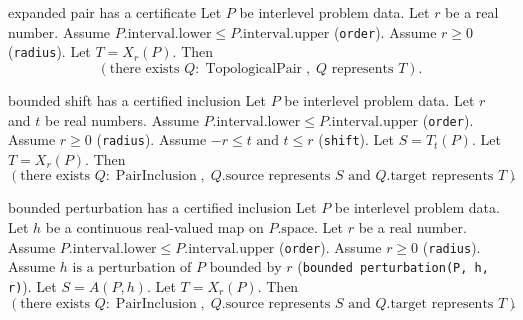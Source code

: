 \begin{cleanresult}{expanded pair has a certificate}
Let $P$ be interlevel problem data.
Let $r$ be a real number.
Assume $P.\mathrm{interval}.\mathrm{lower}\le P.\mathrm{interval}.\mathrm{upper}$ (\texttt{order}).
Assume $r\ge 0$ (\texttt{radius}).
Let $T = X_{r}(P)$.
Then \[\left(\text{there exists }Q : \operatorname{TopologicalPair},\; Q\text{ represents }T\right).\]
\end{cleanresult}

\begin{cleanresult}{bounded shift has a certified inclusion}
Let $P$ be interlevel problem data.
Let $r$ and $t$ be real numbers.
Assume $P.\mathrm{interval}.\mathrm{lower}\le P.\mathrm{interval}.\mathrm{upper}$ (\texttt{order}).
Assume $r\ge 0$ (\texttt{radius}).
Assume $-r\le t\text{ and }t\le r$ (\texttt{shift}).
Let $S = T_{t}(P)$.
Let $T = X_{r}(P)$.
Then \[\left(\text{there exists }Q : \operatorname{PairInclusion},\; Q.\mathrm{source}\text{ represents }S\text{ and }Q.\mathrm{target}\text{ represents }T\right).\]
\par{}
\end{cleanresult}

\begin{cleanresult}{bounded perturbation has a certified inclusion}
Let $P$ be interlevel problem data.
Let $h$ be a continuous real-valued map on $P.\mathrm{space}$.
Let $r$ be a real number.
Assume $P.\mathrm{interval}.\mathrm{lower}\le P.\mathrm{interval}.\mathrm{upper}$ (\texttt{order}).
Assume $r\ge 0$ (\texttt{radius}).
Assume $h\text{ is a perturbation of }P\text{ bounded by }r$ (\texttt{bounded perturbation(P, h, r)}).
Let $S = A(P,h)$.
Let $T = X_{r}(P)$.
Then \[\left(\text{there exists }Q : \operatorname{PairInclusion},\; Q.\mathrm{source}\text{ represents }S\text{ and }Q.\mathrm{target}\text{ represents }T\right).\]
\par{}
\end{cleanresult}

